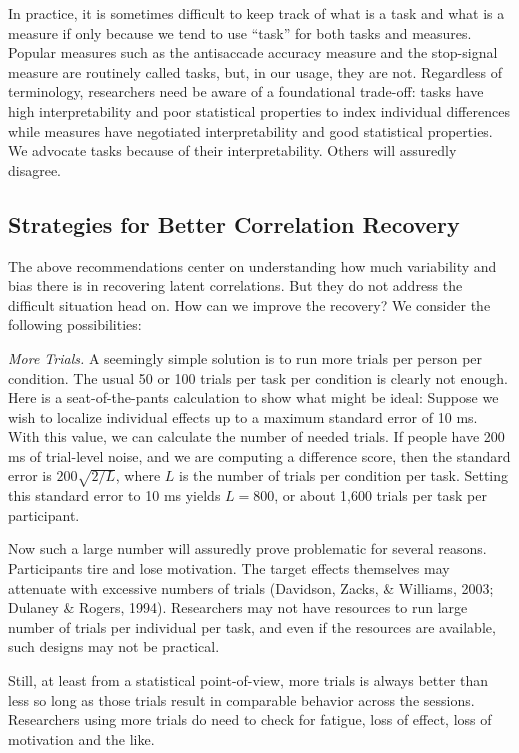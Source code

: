 \documentclass[
  english,
  ,man]{apa6}
\begin{document}
In practice, it is sometimes difficult to keep track of what is a task and what is a measure if only because we tend to use ``task'' for both tasks and measures. Popular measures such as the antisaccade accuracy measure and the stop-signal measure are routinely called tasks, but, in our usage, they are not. Regardless of terminology,
researchers need be aware of a foundational trade-off: tasks have high interpretability and poor statistical properties to index individual differences while measures have negotiated interpretability and good statistical properties. We advocate tasks because of their interpretability. Others will assuredly disagree.

\hypertarget{strategies-for-better-correlation-recovery}{%
\subsection{Strategies for Better Correlation Recovery}\label{strategies-for-better-correlation-recovery}}

The above recommendations center on understanding how much variability and bias there is in recovering latent correlations. But they do not address the difficult situation head on. How can we improve the recovery? We consider the following possibilities:

\emph{More Trials.} A seemingly simple solution is to run more trials per person per condition. The usual 50 or 100 trials per task per condition is clearly not enough. Here is a seat-of-the-pants calculation to show what might be ideal: Suppose we wish to localize individual effects up to a maximum standard error of 10 ms. With this value, we can calculate the number of needed trials. If people have 200 ms of trial-level noise, and we are computing a difference score, then the standard error is \(200\sqrt{2/L}\), where \(L\) is the number of trials per condition per task. Setting this standard error to 10 ms yields \(L=800\), or about 1,600 trials per task per participant.

Now such a large number will assuredly prove problematic for several reasons. Participants tire and lose motivation. The target effects themselves may attenuate with excessive numbers of trials (Davidson, Zacks, \& Williams, 2003; Dulaney \& Rogers, 1994). Researchers may not have resources to run large number of trials per individual per task, and even if the resources are available, such designs may not be practical.

Still, at least from a statistical point-of-view, more trials is always better than less so long as those trials result in comparable behavior across the sessions. Researchers using more trials do need to check for fatigue, loss of effect, loss of motivation and the like.
\end{document}
